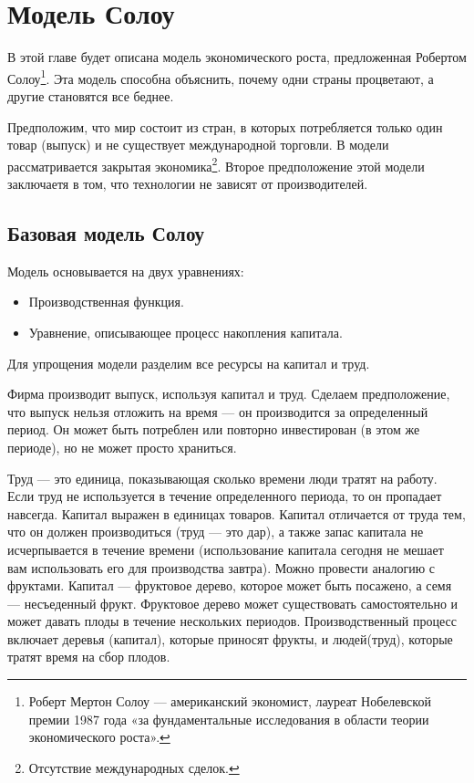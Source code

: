 \chapter{Модель Солоу}
\label{cha:solow_models}

В этой главе будет описана модель экономического роста, предложенная Робертом Солоу\footnote{Роберт Мертон Солоу --- американский экономист, лауреат Нобелевской премии 1987 года «за фундаментальные исследования в области теории экономического роста»\cite{wiki_solow}.}.
Эта модель способна объяснить, почему одни страны процветают, а другие становятся все беднее.

Предположим, что мир состоит из стран, в которых потребляется только один товар (выпуск) и не существует международной торговли.
В модели рассматривается закрытая экономика\footnote{Отсутствие международных сделок.}.
Второе предположение этой модели заключаетя в том, что технологии не зависят от производителей.

\section{Базовая модель Солоу}

Модель основывается на двух уравнениях:
\begin{itemize}
	\item Производственная функция.
	\item Уравнение, описывающее процесс накопления капитала.
\end{itemize}
Для упрощения модели разделим все ресурсы на капитал и труд.

Фирма производит выпуск, используя капитал и труд.
Сделаем предположение, что выпуск нельзя отложить на время --- он производится за определенный период.
Он может быть потреблен или повторно инвестирован (в этом же периоде), но не может просто храниться.

Труд --- это единица, показывающая сколько времени люди тратят на работу.
Если труд не используется в течение определенного периода, то он пропадает навсегда.
Капитал выражен в единицах товаров.
Капитал отличается от труда тем, что он должен производиться (труд --- это дар), а также запас капитала не исчерпывается в течение времени (использование капитала сегодня не мешает вам использовать его для производства завтра).
Можно провести аналогию с фруктами.
Капитал --- фруктовое дерево, которое может быть посажено, а семя --- несъеденный фрукт.
Фруктовое дерево может существовать самостоятельно и может давать плоды в течение нескольких периодов.
Производственный процесс включает деревья (капитал), которые приносят фрукты, и людей(труд), которые тратят время на сбор плодов.

